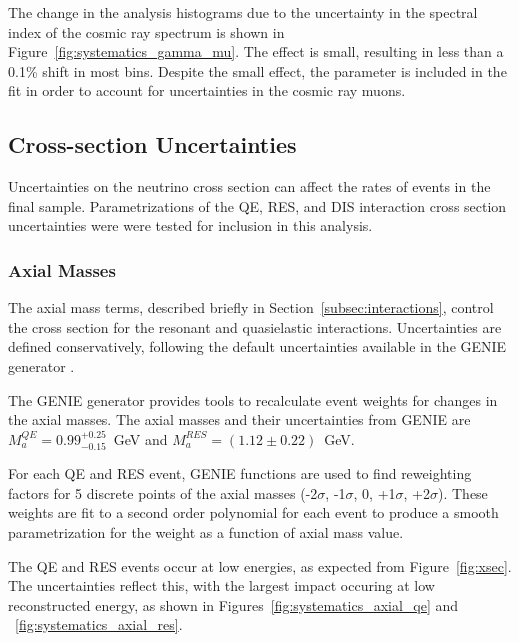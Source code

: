 The change in the analysis histograms due to the uncertainty in the spectral index of the cosmic ray spectrum is shown in Figure~\ref{fig:systematics_gamma_mu}.
The effect is small, resulting in less than a 0.1\% shift in most bins. 
Despite the small effect, the parameter is included in the fit in order to account for uncertainties in the cosmic ray muons.


\label{subsec:xsec_systematics}
\subsection{Cross-section Uncertainties}
Uncertainties on the neutrino cross section can affect the rates of events in the final sample.
Parametrizations of the QE, RES, and DIS interaction cross section uncertainties were were tested for inclusion in this analysis.

\label{subsubsec:axial_masses}
\subsubsection{Axial Masses}
The axial mass terms, described briefly in Section~\ref{subsec:interactions}, control the cross section for the resonant and quasielastic interactions.
Uncertainties are defined conservatively, following the default uncertainties available in the GENIE generator \cite{GENIE}.

The GENIE generator provides tools to recalculate event weights for changes in the axial masses.
The axial masses and their uncertainties from GENIE are $M_a^{QE}=0.99^{+0.25}_{-0.15}$~GeV and $M_a^{RES}=(1.12 \pm 0.22)$~GeV.

For each QE and RES event, GENIE functions are used to find reweighting factors for 5 discrete points of the axial masses (-2$\sigma$, -1$\sigma$, 0, +1$\sigma$, +2$\sigma$).
These weights are fit to a second order polynomial for each event to produce a smooth parametrization for the weight as a function of axial mass value.

The QE and RES events occur at low energies, as expected from Figure~\ref{fig:xsec}.
The uncertainties reflect this, with the largest impact occuring at low reconstructed energy, as shown in Figures~\ref{fig:systematics_axial_qe} and ~\ref{fig:systematics_axial_res}.


